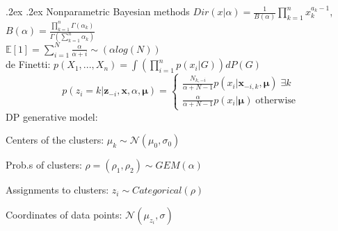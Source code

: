 \documentclass[11pt,landscape,a4paper,fleqn]{article}
\makeatletter
\renewcommand{\section}{\@startsection{section}{1}{0mm}%
                                {.2ex}%
                                {.2ex}%
	                                {\color{myred}\sffamily\small\bfseries}}
\renewcommand{\subsection}{\@startsection{subsection}{1}{0mm}%
                                {.2ex}%
                                {.2ex}%
                                {\color{black}\sffamily\bfseries}}
\makeatother
\begin{document}
\begin{multicols*}{4}
\section{Nonparametric Bayesian methods}
$Dir(x|\alpha) = \frac{1}{B(\alpha)} \prod_{k=1}^n x_k^{a_k - 1}$, $B(\alpha) = \frac{\prod_{k=1}^n \Gamma(\alpha_k)}{\Gamma(\sum_{k=1}^n \alpha_k)}$ \\
$\mathbb{E}[1] = \sum_{i=1}^N \frac{\alpha}{\alpha + i} \sim(\alpha log(N))$ \\
de Finetti: $p(X_1, ..., X_n) {=} \int (\prod_{i=1}^n p(x_i|G))dP(G)$ \\
\[ p(z_i=k|\bm{z}_{-i},\bm{x},\alpha,\bm{\mu}) = \begin{cases}
      \frac{N_{k,-i}}{\alpha + N - 1} p(x_i|\bm{x}_{-i,k},\bm{\mu}) \;\exists k \\
      \frac{\alpha}{\alpha + N - 1} p(x_i|\bm{\mu}) \;\text{otherwise}
   \end{cases}
\]
DP generative model: \\
\begin{inparaitem}[\color{red}\textbullet]
\item Centers of the clusters: $\mu_k \sim \mathcal{N}(\mu_0, \sigma_0)$ \\
\item Prob.s of clusters: $\rho = (\rho_1, \rho_2) \sim  GEM(\alpha)$ \\
\item Assignments to clusters: $z_i \sim Categorical(\rho)$ \\
\item Coordinates of data points: $\mathcal{N}(\mu_{z_i}, \sigma)$
\end{inparaitem}




\end{multicols*}
\end{document}
